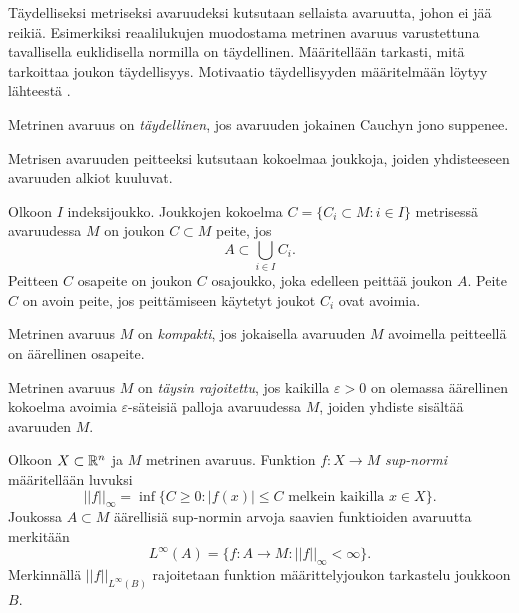 \documentclass[12pt,oneside,a4paper]{amsbook} %
\begin{document}
Täydelliseksi metriseksi avaruudeksi kutsutaan sellaista avaruutta, johon ei jää reikiä. Esimerkiksi reaalilukujen muodostama metrinen avaruus varustettuna tavallisella euklidisella normilla on täydellinen. Määritellään tarkasti, mitä tarkoittaa joukon täydellisyys. Motivaatio täydellisyyden määritelmään löytyy lähteestä \cite[s.54]{rudin}.

\begin{definition}
    Metrinen avaruus on \textit{täydellinen}, jos avaruuden jokainen Cauchyn jono suppenee. 
\end{definition} 

Metrisen avaruuden peitteeksi kutsutaan kokoelmaa joukkoja, joiden yhdisteeseen avaruuden alkiot kuuluvat.

\begin{definition}
    Olkoon $I$ indeksijoukko. Joukkojen kokoelma $C = \{C_i \subset M \colon i \in I\}$ metrisessä avaruudessa $M$ on joukon $C \subset M$ peite, jos 
    \begin{equation*}
        A \subset \bigcup_{i\in I}C_i.
    \end{equation*}
    Peitteen $C$ osapeite on joukon $C$ osajoukko, joka edelleen peittää joukon $A$. Peite $C$ on avoin peite, jos peittämiseen käytetyt joukot $C_i$ ovat avoimia. 
\end{definition}



\begin{definition}
    Metrinen avaruus $M$ on \textit{kompakti}, jos jokaisella avaruuden $M$ avoimella peitteellä on äärellinen osapeite. 
\end{definition}

\begin{definition}
    Metrinen avaruus $M$ on \textit{täysin rajoitettu}, jos kaikilla $\varepsilon > 0$ on olemassa äärellinen kokoelma avoimia $\varepsilon$-säteisiä palloja avaruudessa $M$, joiden yhdiste sisältää avaruuden $M$.
\end{definition}

\begin{definition}
Olkoon $X\subset \mathbb{R}^n$ ja $M$ metrinen avaruus. Funktion $f: X \to M$ \textit{sup-normi} määritellään luvuksi
\begin{equation*}
    ||f||_\infty = \inf\{C \ge 0 : |f(x)| \le C \text{ melkein kaikilla } x \in X\}.
\end{equation*}
Joukossa $A\subset M$ äärellisiä sup-normin arvoja saavien funktioiden avaruutta merkitään
    \[L^\infty (A) = \{f:A\to M \colon  ||f||_\infty < \infty\}.\] 
Merkinnällä $||f||_{L^\infty(B)}$ rajoitetaan funktion määrittelyjoukon tarkastelu joukkoon $B$.
\end{definition}
\end{document}
